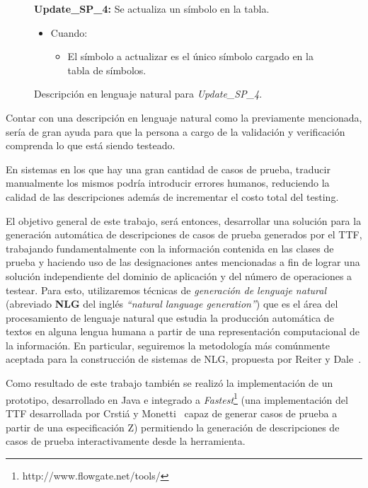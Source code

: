 \begin{figure}[H]
\textbf{Update\_SP\_4:} Se actualiza un símbolo en la tabla.  
  \begin{itemize}
   \item{Cuando:}
   \begin{itemize}
  	  \item{El símbolo a actualizar es el único símbolo cargado en la tabla de símbolos.}   
   \end{itemize}
  \end{itemize}
  \caption{Descripción en lenguaje natural para \emph{Update\_SP\_4}.}
  \label{fig:intro_tcl}
\end{figure}

Contar con una descripción en lenguaje natural como la previamente mencionada, sería de gran ayuda para que la persona a cargo de la validación y verificación comprenda lo que está siendo testeado.

En sistemas en los que hay una gran cantidad de casos de prueba, traducir manualmente  los mismos podría introducir errores humanos, reduciendo la calidad de las descripciones además de incrementar el costo total del testing.

El objetivo general de este trabajo, será entonces, desarrollar una solución para la generación automática de descripciones de casos de prueba generados por el TTF, trabajando fundamentalmente con la información contenida en las clases de prueba y haciendo uso de las designaciones antes mencionadas a fin de lograr una solución independiente del dominio de aplicación y del número de operaciones a testear. Para esto, utilizaremos técnicas de \emph{generación de lenguaje natural} (abreviado \textbf{NLG} del inglés  \emph{``natural language generation''}) que es el área del procesamiento de lenguaje natural que estudia la producción automática de textos en alguna lengua humana a partir de una representación computacional de la información. En particular, seguiremos la metodología más comúnmente aceptada para la construcción de sistemas de NLG, propuesta por Reiter y Dale~\cite{reiter_dale}.

Como resultado de este trabajo también se realizó la implementación de un prototipo, desarrollado en Java e integrado a \emph{Fastest}\footnote{http://www.flowgate.net/tools/} (una implementación del TTF desarrollada por Crstiá y Monetti~\cite{fastest1} capaz de generar casos de prueba a partir de una especificación Z) permitiendo la generación de descripciones de casos de prueba interactivamente desde la herramienta. 


